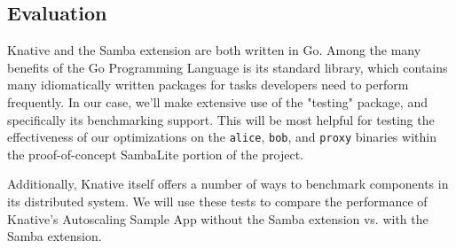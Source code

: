 \subsection{Evaluation}
\label{sec:eval}

Knative and the Samba extension are both written in Go.
Among the many benefits of the Go Programming Language is its standard library, which contains many idiomatically written packages for tasks developers need to perform frequently.
In our case, we'll make extensive use of the "testing" package, and specifically its benchmarking support.
This will be most helpful for testing the effectiveness of our optimizations on the \texttt{alice}, \texttt{bob}, and \texttt{proxy} binaries within the proof-of-concept SambaLite portion of the project.

Additionally, Knative itself offers a number of ways to benchmark components in its distributed system.
\cite{knative_serving}
We will use these tests to compare the performance of Knative's Autoscaling Sample App without the Samba extension vs. with the Samba extension.
\cite{autoscale_sample_app_go}
